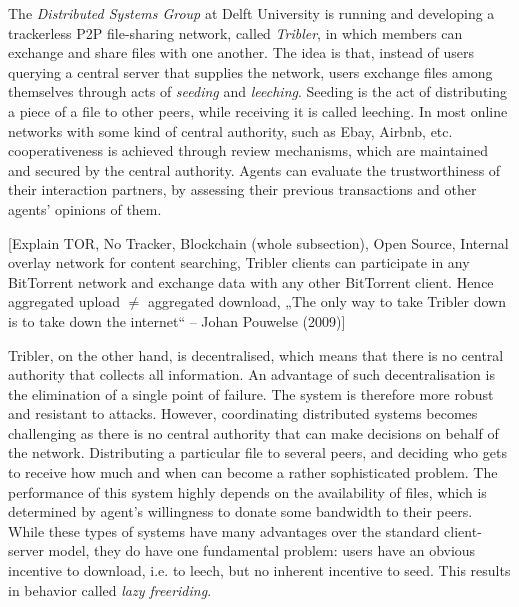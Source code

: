 \documentclass[11pt,a4paper]{report}
\theoremstyle{definition}
\theoremstyle{theorem}
\theoremstyle{proposition}
\theoremstyle{corollary}
\theoremstyle{lemma}
\theoremstyle{example}
\theoremstyle{remark}
\begin{document}
\noindent{}The {\it Distributed Systems Group} at Delft University is running and developing a trackerless P2P file-sharing network, called {\it Tribler}, in which members can exchange and share files with one another. The idea is that, instead of users querying a central server that supplies the network, users exchange files among themselves through acts of {\it seeding} and {\it leeching}. Seeding is the act of distributing a piece of a file to other peers, while receiving it is called leeching. In most online networks with some kind of central authority, such as Ebay, Airbnb, etc. cooperativeness is achieved through review mechanisms, which are maintained and secured by the central authority. Agents can evaluate the trustworthiness of their interaction partners, by assessing their previous transactions and other agents' opinions of them.\vspace{1em}\\ 

\noindent{} \begin{center} [Explain TOR, No Tracker, Blockchain (whole subsection), Open Source, Internal overlay network for content searching, Tribler clients can participate in any BitTorrent network and exchange data with any other BitTorrent client. Hence aggregated upload $\neq$ aggregated download, „The only way to take Tribler down is to take down the internet“ – Johan Pouwelse (2009)] \end{center}

\noindent{}Tribler, on the other hand, is decentralised, which means that there is no central authority that collects all information. An advantage of such decentralisation is the elimination of a single point of failure. The system is therefore more robust and resistant to attacks. However, coordinating distributed systems becomes challenging as there is no central authority that can make decisions on behalf of the network. Distributing a particular file to several peers, and deciding who gets to receive how much and when can become a rather sophisticated problem. The performance of this system highly depends on the availability of files, which is determined by agent's willingness to donate some bandwidth to their peers. While these types of systems have many advantages over the standard client-server model, they do have one fundamental problem: users have an obvious incentive to download, i.e. to leech, but no inherent incentive to seed. This results in behavior called {\it lazy freeriding}. \vspace{1em}\\
\end{document}

